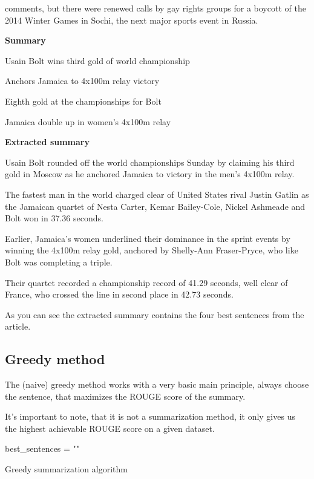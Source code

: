 {comments, but there were renewed calls by gay rights groups for a boycott of the 2014 Winter Games in Sochi, the next major sports event in Russia.

\textbf{Summary}

Usain Bolt wins third gold of world championship

Anchors Jamaica to 4x100m relay victory

Eighth gold at the championships for Bolt

Jamaica double up in women's 4x100m relay

\textbf{Extracted summary}

Usain Bolt rounded off the world championships Sunday by claiming his third gold in Moscow as he anchored Jamaica to victory in the men's 4x100m relay.

The fastest man in the world charged clear of United States rival Justin Gatlin as the Jamaican quartet of Nesta Carter, Kemar Bailey-Cole, Nickel Ashmeade and Bolt won in 37.36 seconds.

Earlier, Jamaica's women underlined their dominance in the sprint events by winning the 4x100m relay gold, anchored by Shelly-Ann Fraser-Pryce, who like Bolt was completing a triple.

Their quartet recorded a championship record of 41.29 seconds, well clear of France, who crossed the line in second place in 42.73 seconds.
}

As you can see the extracted summary contains the four best sentences from the article.

\subsection{Greedy method}
The (naive) greedy method works with a very basic main principle, always choose the sentence, that maximizes the ROUGE score of the summary.

It's important to note, that it is not a summarization method, it only gives us the highest achievable ROUGE score on a given dataset.

\begin{algorithm}
	\SetAlgoLined
	best\_sentences = ""\;
	\caption{Greedy summarization algorithm}
\end{algorithm}

